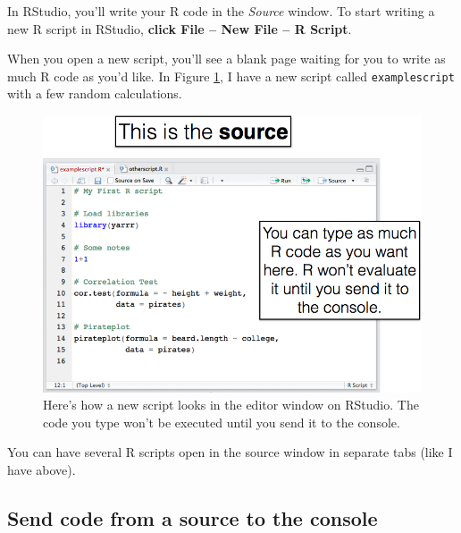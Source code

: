 \documentclass[
]{book}
\begin{document}
In RStudio, you'll write your R code in the \emph{Source} window. To start writing a new R script in RStudio, \textbf{click File -- New File -- R Script}.

When you open a new script, you'll see a blank page waiting for you to write as much R code as you'd like. In Figure \ref{fig:editor}, I have a new script called \texttt{examplescript} with a few random calculations.

\begin{figure}

{\centering \includegraphics[width=0.75\linewidth]{images/chapter-2/sourcess} 

}

\caption{Here's how a new script looks in the editor window on RStudio. The code you type won't be executed until you send it to the console.}\label{fig:editor}
\end{figure}

You can have several R scripts open in the source window in separate tabs (like I have above).

\hypertarget{send-code-from-a-source-to-the-console}{%
\subsection{Send code from a source to the console}\label{send-code-from-a-source-to-the-console}}
\end{document}
